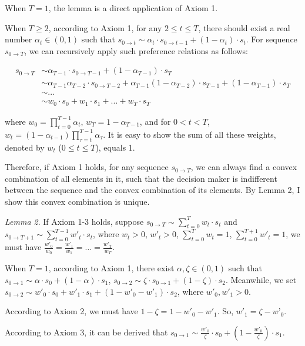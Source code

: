\documentclass[
  12pt,
]{article}
\begin{document}
When \(T=1\), the lemma is a direct application of Axiom 1.

When \(T\geq 2\), according to Axiom 1, for any \(2\leq t\leq T\), there
should exist a real number \(\alpha_t\in(0,1)\) such that
\(s_{0\rightarrow t}\sim \alpha_t\cdot s_{0\rightarrow t-1}+(1-\alpha_t)\cdot s_{t}\).
For sequence \(s_{0\rightarrow T}\), we can recursively apply such
preference relations as follows:

\[
\begin{aligned}
s_{0\rightarrow T} &\sim \alpha_{T-1}\cdot s_{0\rightarrow T-1} + (1-\alpha_{T-1})\cdot s_T \\
&\sim  \alpha_{T-1}\alpha_{T-2}\cdot s_{0\rightarrow T-2} + \alpha_{T-1}(1-\alpha_{T-2})\cdot s_{T-1} + (1-\alpha_{T-1})\cdot s_T \\
& \sim ...\\
& \sim w_0 \cdot s_0 + w_1\cdot s_1 +... +w_T\cdot s_T
\end{aligned}
\]

where \(w_0=\prod_{t=0}^{T-1}\alpha_t\), \(w_T = 1-\alpha_{T-1}\), and
for \(0<t<T\),
\(w_t=(1-\alpha_{t-1})\prod_{\tau=t}^{T-1}\alpha_{\tau}\). It is easy to
show the sum of all these weights, denoted by \(w_t\)
(\(0\leq t\leq T\)), equals 1.

Therefore, if Axiom 1 holds, for any sequence \(s_{0\rightarrow T}\), we
can always find a convex combination of all elements in it, such that
the decision maker is indifferent between the sequence and the convex
combination of its elements. By Lemma 2, I show this convex combination
is unique.

\emph{Lemma 2}. If Axiom 1-3 holds, suppose
\(s_{0\rightarrow T}\sim \sum_{t=0}^T w_t \cdot s_t\) and
\(s_{0\rightarrow T+1} \sim \sum_{t=0}^{T-1} w'_t\cdot s_t\), where
\(w_t >0\), \(w'_t>0\), \(\sum_{t=0}^Tw_t=1\),
\(\sum_{t=0}^{T+1}w'_t=1\), we must have
\(\frac{w'_0}{w_0}=\frac{w'_1}{w_1}=…=\frac{w'_T}{w_T}\).

When \(T=1\), according to Axiom 1, there exist
\(\alpha,\zeta \in (0,1)\) such that
\(s_{0 \rightarrow 1}\sim\alpha\cdot s_0 + (1-\alpha)\cdot s_1\),
\(s_{0\rightarrow 2} \sim \zeta\cdot s_{0\rightarrow 1} + (1-\zeta)\cdot s_2\).
Meanwhile, we set
\(s_{0\rightarrow 2} \sim w'_0\cdot s_0 + w'_1\cdot s_1 + (1-w'_0-w'_1)\cdot s_2\),
where \(w'_0, w'_1 > 0\).

According to Axiom 2, we must have \(1-\zeta=1-w'_0-w'_1\). So,
\(w'_1=\zeta-w’_0\).

According to Axiom 3, it can be derived that
\(s_{0\rightarrow 1} \sim \frac{w'_0}{\zeta}\cdot s_0 + (1-\frac{w'_0}{\zeta})\cdot s_1\).
\end{document}
